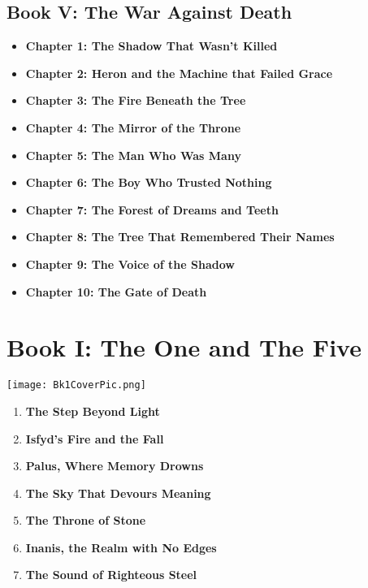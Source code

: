 \documentclass[9pt]{article}
\begin{document}
\subsection*{Book V: The War Against Death}
\begin{itemize}
  \item \textbf{Chapter 1: The Shadow That Wasn’t Killed}
  \item \textbf{Chapter 2: Heron and the Machine that Failed Grace}
  \item \textbf{Chapter 3: The Fire Beneath the Tree}
  \item \textbf{Chapter 4: The Mirror of the Throne}
  \item \textbf{Chapter 5: The Man Who Was Many}
  \item \textbf{Chapter 6: The Boy Who Trusted Nothing}
  \item \textbf{Chapter 7: The Forest of Dreams and Teeth}
  \item \textbf{Chapter 8: The Tree That Remembered Their Names}
  \item \textbf{Chapter 9: The Voice of the Shadow}
  \item \textbf{Chapter 10: The Gate of Death}
\end{itemize}

\newpage

\section*{Book I: The One and The Five}

\vspace{1in}

\begin{center}
    \texttt{[image: Bk1CoverPic.png]}
\end{center}

\vspace{1in}

\begin{enumerate}
    \item \textbf{The Step Beyond Light} 

    \vspace{1em}
    \item \textbf{Isfyd's Fire and the Fall} 

    \vspace{1em}
    \item \textbf{Palus, Where Memory Drowns} 

    \vspace{1em}
    \item \textbf{The Sky That Devours Meaning} 

    \vspace{1em}
    \item \textbf{The Throne of Stone} 

    \vspace{1em}
    \item \textbf{Inanis, the Realm with No Edges}

    \vspace{1em}
    \item \textbf{The Sound of Righteous Steel} 

\end{enumerate}
\end{document}
